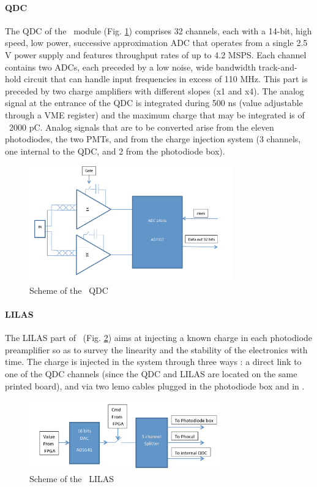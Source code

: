 \paragraph{QDC}

The QDC of the \lascar~module (Fig. \ref{fig:laslascarqdc}) comprises 32 channels, each with a 14-bit, high speed, low power, successive approximation ADC that operates from a single 2.5 V power supply and features throughput rates of up to 4.2 MSPS. Each channel contains two ADCs, each preceded by a low noise, wide bandwidth track-and-hold circuit that can handle input frequencies in excess of 110 MHz. This part is preceded by two charge amplifiers with different slopes (x1 and x4). The analog signal at the entrance of the QDC is integrated during 500 ns (value adjustable through a VME register) and the maximum charge that may be integrated is of ~2000 pC. Analog signals that are to be converted arise from the eleven photodiodes, the two PMTs, and from the charge injection system (3 channels, one internal to the QDC, and 2 from the photodiode box). 
 
\begin{figure}[htbp]

\centering
\includegraphics[height=5cm]{figures/qdc.pdf}
\caption{Scheme of the \lascar~QDC}\label{fig:laslascarqdc}
\end{figure}

\paragraph{LILAS}
The LILAS part of \lascar~(Fig. \ref{fig:laslascarlilas}) aims at injecting a known charge in each photodiode preamplifier so as to survey the linearity and the stability of the electronics with time. The charge is injected in the system through three ways : a direct link to one of the QDC channels (since the QDC and LILAS are located on the same printed board), and via two lemo cables plugged in the photodiode box and in \phocal.  

\begin{figure}[htbp]

\centering
\includegraphics[height=3cm]{figures/lilas.pdf}
\caption{Scheme of the \lascar~LILAS}\label{fig:laslascarlilas}
\end{figure}

